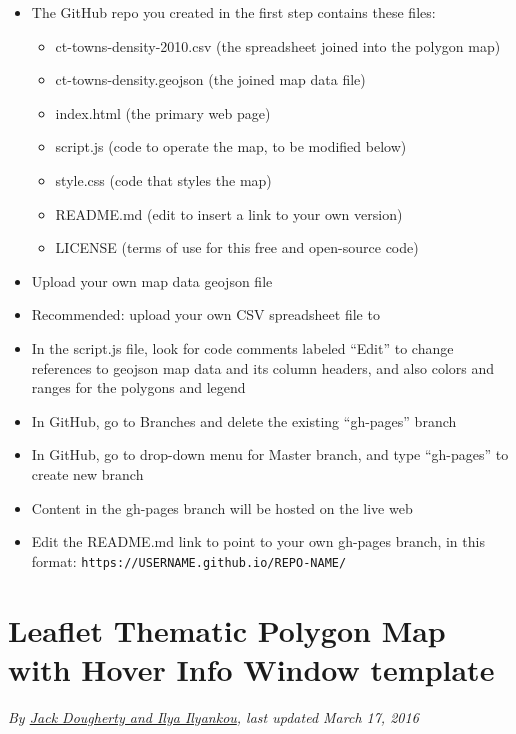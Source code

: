 \documentclass[
  english,
]{book}
\providecommand{\tightlist}{%
  \setlength{\itemsep}{0pt}\setlength{\parskip}{0pt}}
\begin{document}
\begin{itemize}
\tightlist
\item
  The GitHub repo you created in the first step contains these files:

  \begin{itemize}
  \tightlist
  \item
    ct-towns-density-2010.csv (the spreadsheet joined into the polygon map)
  \item
    ct-towns-density.geojson (the joined map data file)
  \item
    index.html (the primary web page)
  \item
    script.js (code to operate the map, to be modified below)
  \item
    style.css (code that styles the map)
  \item
    README.md (edit to insert a link to your own version)
  \item
    LICENSE (terms of use for this free and open-source code)
  \end{itemize}
\item
  Upload your own map data geojson file
\item
  Recommended: upload your own CSV spreadsheet file to
\item
  In the script.js file, look for code comments labeled ``Edit'' to change references to geojson map data and its column headers, and also colors and ranges for the polygons and legend
\item
  In GitHub, go to Branches and delete the existing ``gh-pages'' branch
\item
  In GitHub, go to drop-down menu for Master branch, and type ``gh-pages'' to create new branch
\item
  Content in the gh-pages branch will be hosted on the live web
\item
  Edit the README.md link to point to your own gh-pages branch, in this format:
  \texttt{https://USERNAME.github.io/REPO-NAME/}
\end{itemize}

\hypertarget{leaflet-polygon-map-hover}{%
\section{Leaflet Thematic Polygon Map with Hover Info Window template}\label{leaflet-polygon-map-hover}}

\emph{By \href{authors}{Jack Dougherty and Ilya Ilyankou}, last updated March 17, 2016}
\end{document}
